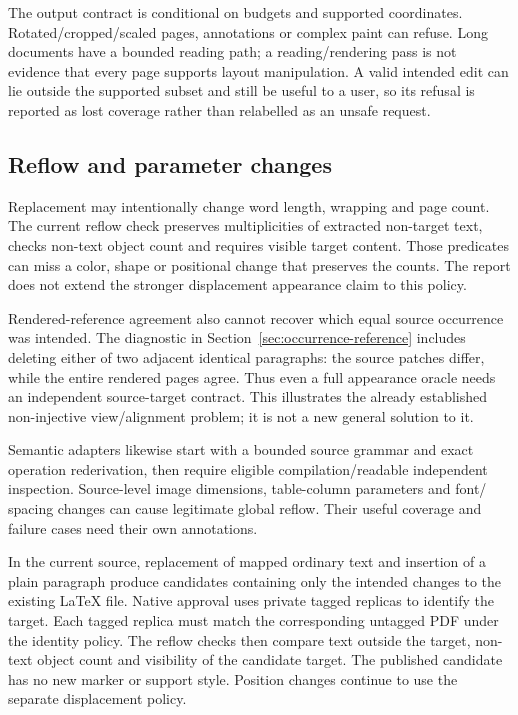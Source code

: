 The output contract is conditional on budgets and supported coordinates.
Rotated/cropped/scaled pages, annotations or complex paint can refuse. Long
documents have a bounded reading path; a reading/rendering pass is not evidence
that every page supports layout manipulation. A valid intended edit can lie
outside the supported subset and still be useful to a user, so its refusal is
reported as lost coverage rather than relabelled as an unsafe request.

\subsection{Reflow and parameter changes}
Replacement may intentionally change word length, wrapping and page count.
The current reflow check preserves multiplicities of extracted non-target
text, checks non-text object count and requires visible target content. Those
predicates can miss a color, shape or positional change that preserves the
counts. The report does not extend the stronger displacement appearance
claim to this policy.

Rendered-reference agreement also cannot recover which equal source occurrence
was intended. The diagnostic in Section~\ref{sec:occurrence-reference} includes
deleting either of two adjacent identical paragraphs: the source patches differ,
while the entire rendered pages agree. Thus even a full appearance oracle needs
an independent source-target contract. This illustrates the already established
non-injective view/alignment problem; it is not a new general solution to it.

Semantic adapters likewise start with a bounded source grammar and exact
operation rederivation, then require eligible compilation/readable independent
inspection. Source-level image dimensions, table-column parameters and font/
spacing changes can cause legitimate global reflow. Their useful coverage and
failure cases need their own annotations.

In the current source, replacement of mapped ordinary text and insertion of
a plain paragraph produce candidates containing only the intended changes to
the existing \LaTeX{} file. Native approval uses private tagged replicas to
identify the target. Each tagged replica must match the corresponding untagged
PDF under the identity policy. The reflow checks then compare text outside the
target, non-text object count and visibility of the candidate target. The
published candidate has no new marker or support style. Position changes
continue to use the separate displacement policy.

